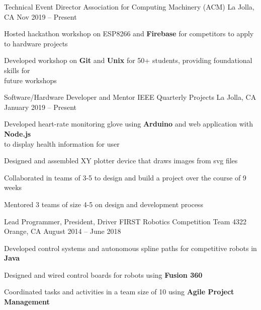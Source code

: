 \documentclass[]{awesome-cv}
\begin{document}
\vspace{-5mm}
\begin{cventries}
	\cventry
  {Technical Event Director}
  {Association for Computing Machinery (ACM)}
	{La Jolla, CA}
  {Nov 2019 – Present}
	{\begin{cvitems}
    \item {Hosted hackathon workshop on ESP8266 and \textbf{Firebase} for
      competitors to apply to hardware projects}
    \item {Developed workshop on \textbf{Git} and \textbf{Unix} for 50+
      students, providing foundational skills for \\ future workshops}
		\end{cvitems}}

	\vspace{-3mm}
	\cventry
  {Software/Hardware Developer and  Mentor}
	{IEEE Quarterly Projects}
	{La Jolla, CA}
  {January 2019 – Present}
	{\begin{cvitems}
    \item {Developed heart-rate monitoring glove using \textbf{Arduino} and
      web application with \textbf{Node.js}\\ to display health information for
      user}
    \item {Designed and assembled XY plotter device that draws images from svg
      files}
    \item {Collaborated in teams of 3-5 to design and build a project over the
      course of 9 weeks}
    \item {Mentored 3 teams of size 4-5 on design and development process}
		\end{cvitems}}

	\vspace{-3mm}
	\cventry
	{Lead Programmer, President, Driver}
	{FIRST Robotics Competition Team 4322}
	{Orange, CA}
	{August 2014 – June 2018}
	{\begin{cvitems}
		\item {Developed control systems and autonomous spline paths for competitive robots in
      \textbf{Java}}
    \item {Designed and wired control boards for robots using
      \textbf{Fusion 360}}
    \item {Coordinated tasks and activities in a team size of 10 using \textbf{Agile
      Project Management}}
		\end{cvitems}}


\end{cventries}
\end{document}
